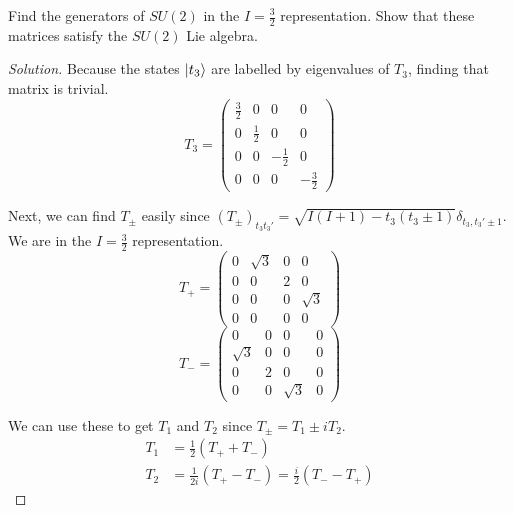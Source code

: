 \documentclass[12pt]{article}
\newenvironment{question}[2][Question]{\begin{trivlist}
\item[\hskip \labelsep {\bfseries #1}\hskip \labelsep {\bfseries #2.}]}{\end{trivlist}}
\newenvironment{solution}{\begin{proof}[Solution]}{\end{proof}}
\begin{document}
\newpage

\begin{question}{22.1}
Find the generators of $SU(2)$ in the $I=\frac{3}{2}$ representation. Show that these matrices satisfy the $SU(2)$ Lie algebra.
\end{question}

\begin{solution}

Because the states $\ket{t_3}$ are labelled by eigenvalues of $T_3$, finding that matrix is trivial.
\begin{equation*}
    \boxed{T_3=\begin{pmatrix}
        \frac{3}{2} & 0 & 0 & 0 \\
        0 & \frac{1}{2} & 0 & 0 \\
        0 & 0 & -\frac{1}{2} & 0 \\
        0 & 0 & 0 & -\frac{3}{2}
    \end{pmatrix}}
\end{equation*}

Next, we can find $T_\pm$ easily since $(T_\pm)_{t_3t_3'}=\sqrt{I(I+1)-t_3(t_3\pm1)}\delta_{t_3,t_3'\pm1}$. We are in the $I=\frac{3}{2}$ representation.
\begin{equation*}
    T_+=\begin{pmatrix}
        0 & \sqrt{3} & 0 & 0 \\
        0 & 0 & 2 & 0 \\
        0 & 0 & 0 & \sqrt{3} \\
        0 & 0 & 0 & 0
    \end{pmatrix}
\end{equation*}
\begin{equation*}
    T_-=\begin{pmatrix}
        0 & 0 & 0 & 0 \\
        \sqrt{3} & 0 & 0 & 0 \\
        0 & 2 & 0 & 0 \\
        0 & 0 & \sqrt{3} & 0
    \end{pmatrix}
\end{equation*}

We can use these to get $T_1$ and $T_2$ since $T_\pm=T_1\pm i T_2$.
\begin{align*}
    T_1&=\frac{1}{2}(T_++T_-) \\
    T_2&=\frac{1}{2i}(T_+-T_-)=\frac{i}{2}(T_--T_+)
\end{align*}


\end{solution}
\end{document}
